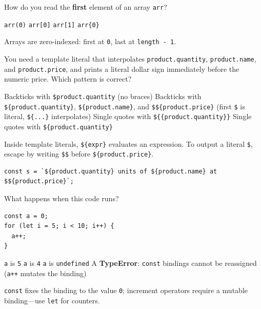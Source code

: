 \question[4]
How do you read the \textbf{first} element of an array \texttt{arr}?
\begin{choices}
  \choice \texttt{arr(0)}
  \CorrectChoice \texttt{arr[0]}
  \choice \texttt{arr[1]}
  \choice \texttt{arr\{0\}}
\end{choices}
\begin{solution}
  Arrays are zero-indexed: first at \texttt{0}, last at \texttt{length - 1}.
\end{solution}

\question[4]
You need a template literal that interpolates \texttt{product.quantity}, \texttt{product.name}, and \texttt{product.price}, and prints a literal dollar sign immediately before the numeric price. Which pattern is correct?
\begin{choices}
  \choice Backticks with \texttt{\$product.quantity} (no braces)
  \CorrectChoice Backticks with \texttt{\$\{product.quantity\}}, \texttt{\$\{product.name\}}, and \texttt{\$\$\{product.price\}} (first \texttt{\$} is literal, \texttt{\$\{...\}} interpolates)
  \choice Single quotes with \texttt{\$\{\{product.quantity\}\}}
  \choice Single quotes with \texttt{\$\{product.quantity\}}
\end{choices}
\begin{solution}
  Inside template literals, \texttt{\$\{expr\}} evaluates an expression. To output a literal \texttt{\$}, escape by writing \texttt{\$\$} before \texttt{\$\{product.price\}}.
\begin{lstlisting}[style=jsexam]
const s = `${product.quantity} units of ${product.name} at $${product.price}`;
\end{lstlisting}
\end{solution}

\question[4]
What happens when this code runs?
\begin{lstlisting}[style=jsexam]
const a = 0;
for (let i = 5; i < 10; i++) {
  a++;
}
\end{lstlisting}
\begin{choices}
  \choice \texttt{a} is \texttt{5}
  \choice \texttt{a} is \texttt{4}
  \choice \texttt{a} is \texttt{undefined}
  \CorrectChoice A \textbf{TypeError}: \texttt{const} bindings cannot be reassigned (\texttt{a++} mutates the binding)
\end{choices}
\begin{solution}
  \texttt{const} fixes the binding to the value \texttt{0}; increment operators require a mutable binding---use \texttt{let} for counters.
\end{solution}

